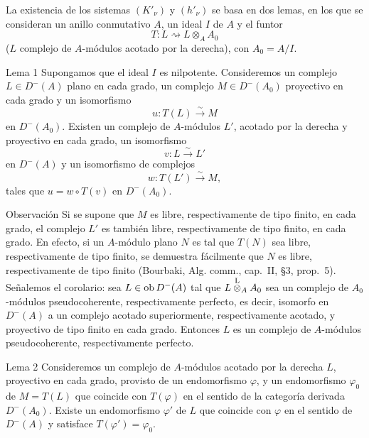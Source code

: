 La existencia de los sistemas $(K'_\nu)$ y $(h'_\nu)$ se basa en dos lemas, en los que se consideran un anillo conmutativo $A$, un ideal $I$ de $A$ y el funtor
\[
T:L\rightsquigarrow L\otimes_A A_0
\]
($L$ complejo de $A$-módulos acotado por la derecha), con $A_0=A/I$.

\begin{statement}{Lema 1}
Supongamos que el ideal $I$ es nilpotente. Consideremos un complejo $L\in D^-(A)$ plano en cada grado, un complejo $M\in D^-(A_0)$ proyectivo en cada grado y un isomorfismo
\[
u:T(L)\xrightarrow{\sim}M
\]
en $D^-(A_0)$. Existen un complejo de $A$-módulos $L'$, acotado por la derecha y proyectivo en cada grado, un isomorfismo
\[
v:L\xrightarrow{\sim}L'
\]
en $D^-(A)$ y un isomorfismo de complejos
\[
w:T(L')\xrightarrow{\sim}M,
\]
tales que $u=w\circ T(v)$ en $D^-(A_0)$.
\end{statement}

\begin{statement}{Observación}
Si se supone que $M$ es libre, respectivamente de tipo finito, en cada grado, el complejo $L'$ es también libre, respectivamente de tipo finito, en cada grado. En efecto, si un $A$-módulo plano $N$ es tal que $T(N)$ sea libre, respectivamente de tipo finito, se demuestra fácilmente que $N$ es libre, respectivamente de tipo finito (Bourbaki, Alg. comm., cap.~II, §3, prop.~5). Señalemos el corolario: sea $L\in\operatorname{ob} D^-(A)$ tal que $L\overset{\mathrm L}{\otimes}_A A_0$ sea un complejo de $A_0$-módulos pseudocoherente, respectivamente perfecto, es decir, isomorfo en $D^-(A)$ a un complejo acotado superiormente, respectivamente acotado, y proyectivo de tipo finito en cada grado. Entonces $L$ es un complejo de $A$-módulos pseudocoherente, respectivamente perfecto.
\end{statement}

\begin{statement}{Lema 2}
Consideremos un complejo de $A$-módulos acotado por la derecha $L$, proyectivo en cada grado, provisto de un endomorfismo $\varphi$, y un endomorfismo $\varphi_0$ de $M=T(L)$ que coincide con $T(\varphi)$ en el sentido de la categoría derivada $D^-(A_0)$. Existe un endomorfismo $\varphi'$ de $L$ que coincide con $\varphi$ en el sentido de $D^-(A)$ y satisface $T(\varphi')=\varphi_0$.
\end{statement}
